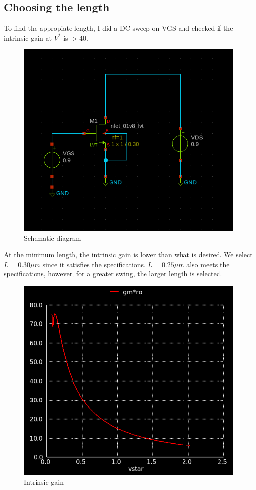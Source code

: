\documentclass[conference]{IEEEtran}
\begin{document}
\subsection{Choosing the length}
To find the appropiate length, I did a DC sweep on VGS and checked if the intrinsic gain at 
$V^*$ is $> 40$.  
\begin{figure}[H]
	\centering 
	\includegraphics[width=\columnwidth]{schem.png}
	\caption{Schematic diagram}
	\label{schematic}
\end{figure}
At the minimum length, the intrinsic gain is lower than what is desired. We select $L=0.30\mu m$ since it satisfies the specifications. $L=0.25\mu m$ also meets the specifications, however, for a greater swing, the larger length is selected. 
\begin{figure}[H]
	\centering 
	\includegraphics[scale=0.40]{gmro.png}
	\caption{Intrinsic gain}
	\label{gmro}
\end{figure}
\end{document}
